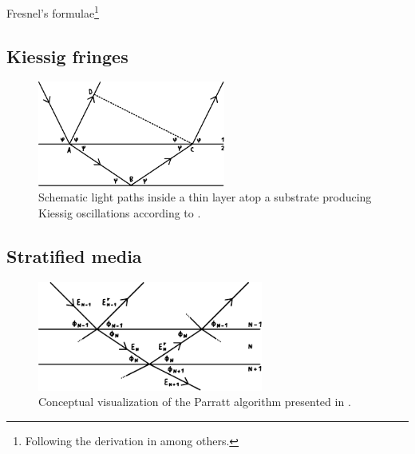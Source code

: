 Fresnel's formulae\footnote{Following the derivation in \cite{McMorrow_2011} among others.}

\subsection{Kiessig fringes}

\cite{Kiessig_1931}

\begin{figure}
	\centering
	\includegraphics[width=0.55\textwidth]{content/graphics/kiessig.pdf}
	\caption{Schematic light paths inside a thin layer atop a substrate producing Kiessig oscillations according to \cite{Kiessig_1931}.}
	\label{fig:kiessig}
\end{figure}


\subsection{Stratified media}

\cite{Parratt_1954}

\begin{figure}
	\centering
	\includegraphics[width=0.66\textwidth]{content/graphics/parratt.pdf}
	\caption{Conceptual visualization of the Parratt algorithm presented in \cite{Parratt_1954}.}
	\label{fig:parratt}
\end{figure}

\cite{xray}
